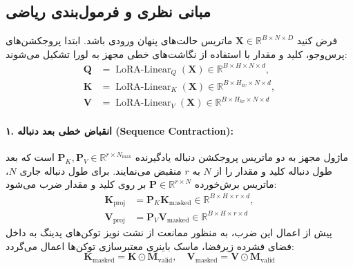 \subsection{مبانی نظری و فرمول‌بندی ریاضی}
فرض کنید $\mathbf{X} \in \mathbb{R}^{B \times N \times D}$ ماتریس حالت‌های پنهان ورودی باشد. ابتدا پروجکشن‌های پرس‌وجو، کلید و مقدار با استفاده از نگاشت‌های خطی مجهز به لورا تشکیل می‌شوند:
\begin{align}
\mathbf{Q} &= \operatorname{LoRA-Linear}_Q(\mathbf{X}) \in \mathbb{R}^{B \times H \times N \times d}, \\
\mathbf{K} &= \operatorname{LoRA-Linear}_K(\mathbf{X}) \in \mathbb{R}^{B \times H_{kv} \times N \times d}, \\
\mathbf{V} &= \operatorname{LoRA-Linear}_V(\mathbf{X}) \in \mathbb{R}^{B \times H_{kv} \times N \times d}
\end{align}

\paragraph{۱. انقباض خطی بعد دنباله (Sequence Contraction):}
ماژول مجهز به دو ماتریس پروجکشن دنباله یادگیرنده $\mathbf{P}_K, \mathbf{P}_V \in \mathbb{R}^{r \times N_{\text{max}}}$ است که بعد طول دنباله کلید و مقدار را از $N$ به $r$ منقبض می‌نمایند. برای طول دنباله جاری $N$، ماتریس برش‌خورده $\mathbf{P} \in \mathbb{R}^{r \times N}$ بر روی کلید و مقدار ضرب می‌شود:
\begin{align}
\mathbf{K}_{\text{proj}} &= \mathbf{P}_K \mathbf{K}_{\text{masked}} \in \mathbb{R}^{B \times H \times r \times d}, \\
\mathbf{V}_{\text{proj}} &= \mathbf{P}_V \mathbf{V}_{\text{masked}} \in \mathbb{R}^{B \times H \times r \times d}
\end{align}
پیش از اعمال این ضرب، به منظور ممانعت از نشت نویز توکن‌های پدینگ به داخل فضای فشرده زیرفضا، ماسک باینری معتبرسازی توکن‌ها اعمال می‌گردد:
\begin{equation}
\mathbf{K}_{\text{masked}} = \mathbf{K} \odot \mathbf{M}_{\text{valid}}, \quad \mathbf{V}_{\text{masked}} = \mathbf{V} \odot \mathbf{M}_{\text{valid}}
\end{equation}

